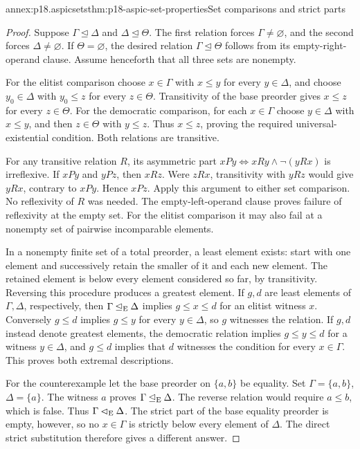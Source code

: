 \begin{annexitem}{annex:p18.aspicsets}{thm:p18-aspic-set-properties}{Set comparisons and strict parts}
\begin{proof}
Suppose \(\Gamma\unlhd\Delta\) and \(\Delta\unlhd\Theta\).
The first relation forces \(\Gamma\ne\varnothing\), and the second forces
\(\Delta\ne\varnothing\). If \(\Theta=\varnothing\), the desired relation
\(\Gamma\unlhd\Theta\) follows from its empty-right-operand clause.
Assume henceforth that all three sets are nonempty.

For the elitist comparison choose \(x\in\Gamma\) with
\(x\leq y\) for every \(y\in\Delta\), and choose \(y_0\in\Delta\)
with \(y_0\leq z\) for every \(z\in\Theta\). Transitivity of the
base preorder gives \(x\leq z\) for every \(z\in\Theta\).
For the democratic comparison, for each \(x\in\Gamma\) choose
\(y\in\Delta\) with \(x\leq y\), and then \(z\in\Theta\)
with \(y\leq z\). Thus \(x\leq z\), proving the required
universal-existential condition. Both relations are transitive.

For any transitive relation \(R\), its asymmetric part
\(xPy\iff xRy\land\neg(yRx)\) is irreflexive. If \(xPy\) and \(yPz\),
then \(xRz\). Were \(zRx\), transitivity with \(yRz\) would give \(yRx\),
contrary to \(xPy\). Hence \(xPz\). Apply this argument to either set
comparison. No reflexivity of \(R\) was needed.
The empty-left-operand clause proves failure of reflexivity at the empty
set. For the elitist comparison it may also fail at a nonempty set of
pairwise incomparable elements.

In a nonempty finite set of a total preorder, a least element exists:
start with one element and successively retain the smaller of it and each
new element. The retained element is below every element considered so far,
by transitivity. Reversing this procedure produces a greatest element.
If \(g,d\) are least elements of \(\Gamma,\Delta\), respectively, then
\(\Gamma\unlhd_{\rm E}\Delta\) implies \(g\leq x\leq d\) for an
elitist witness \(x\). Conversely \(g\leq d\) implies \(g\leq y\)
for every \(y\in\Delta\), so \(g\) witnesses the relation.
If \(g,d\) instead denote greatest elements, the democratic relation
implies \(g\leq y\leq d\) for a witness \(y\in\Delta\), and
\(g\leq d\) implies that \(d\) witnesses the condition for every
\(x\in\Gamma\). This proves both extremal descriptions.

For the counterexample let the base preorder on \(\{a,b\}\) be equality.
Set \(\Gamma=\{a,b\}\), \(\Delta=\{a\}\).
The witness \(a\) proves \(\Gamma\unlhd_{\rm E}\Delta\).
The reverse relation would require \(a\leq b\), which is false.
Thus \(\Gamma\lhd_{\rm E}\Delta\).
The strict part of the base equality preorder is empty, however, so no
\(x\in\Gamma\) is strictly below every element of \(\Delta\).
The direct strict substitution therefore gives a different answer.


\end{proof}
\end{annexitem}

